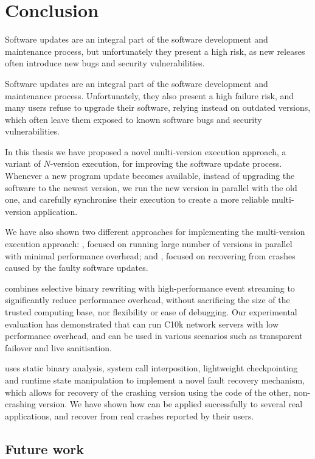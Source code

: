 \chapter{Conclusion}
\label{chap:conclusion}

Software updates are an integral part of the software development and
maintenance process, but unfortunately they present a high risk, as new
releases often introduce new bugs and security vulnerabilities.

Software updates are an integral part of the software development and
maintenance process. Unfortunately, they also present a high failure risk, and
many users refuse to upgrade their software, relying instead on outdated
versions, which often leave them exposed to known software bugs and security
vulnerabilities.

In this thesis we have proposed a novel multi-version execution approach, a
variant of $N$-version execution, for improving the software update process.
Whenever a new program update becomes available, instead of upgrading the
software to the newest version, we run the new version in parallel with the old
one, and carefully synchronise their execution to create a more reliable
multi-version application.

We have also shown two different approaches for implementing the multi-version
execution approach: \varan, focused on running large number of versions in
parallel with minimal performance overhead; and \mx, focused on recovering from
crashes caused by the faulty software updates.

\varan combines selective binary rewriting with high-performance event
streaming to significantly reduce performance overhead, without sacrificing the
size of the trusted computing base, nor flexibility or ease of debugging.  Our
experimental evaluation has demonstrated that \varan can run C10k network
servers with low performance overhead, and can be used in various scenarios
such as transparent failover and live sanitisation.

\mx uses static binary analysis, system call interposition, lightweight
checkpointing and runtime state manipulation to implement a novel fault recovery
mechanism, which allows for recovery of the crashing version using the code
of the other, non-crashing version. We have shown how \mx can be applied
successfully to several real applications, and recover from real crashes
reported by their users.

\section{Future work}
\label{conclusion:future-work}

